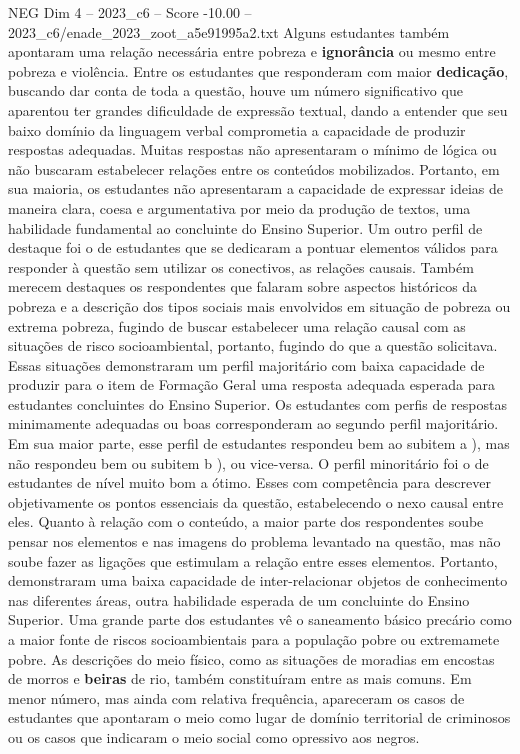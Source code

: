 \begin{textsample}{NEG Dim 4 – 2023\_c6 – Score -10.00 – 2023\_c6/enade\_2023\_zoot\_a5e91995a2.txt}
Alguns estudantes também apontaram uma relação necessária entre pobreza e \textbf{ignorância} ou mesmo entre pobreza e violência.
Entre os estudantes que responderam com maior \textbf{dedicação}, buscando dar conta de toda a questão, houve um número significativo que aparentou ter grandes dificuldade de expressão textual, dando a entender que seu baixo domínio da linguagem verbal comprometia a capacidade de produzir respostas adequadas.
Muitas respostas não apresentaram o mínimo de lógica ou não buscaram estabelecer relações entre os conteúdos mobilizados.
Portanto, em sua maioria, os estudantes não apresentaram a capacidade de expressar ideias de maneira clara, coesa e argumentativa por meio da produção de textos, uma habilidade fundamental ao concluinte do Ensino Superior.
Um outro perfil de destaque foi o de estudantes que se dedicaram a pontuar elementos válidos para responder à questão sem utilizar os conectivos, as relações causais.
Também merecem destaques os respondentes que falaram sobre aspectos históricos da pobreza e a descrição dos tipos sociais mais envolvidos em situação de pobreza ou extrema pobreza, fugindo de buscar estabelecer uma relação causal com as situações de risco socioambiental, portanto, fugindo do que a questão solicitava.
Essas situações demonstraram um perfil majoritário com baixa capacidade de produzir para o item de Formação Geral uma resposta adequada esperada para estudantes concluintes do Ensino Superior.
Os estudantes com perfis de respostas minimamente adequadas ou boas corresponderam ao segundo perfil majoritário.
Em sua maior parte, esse perfil de estudantes respondeu bem ao subitem a ), mas não respondeu bem ou subitem b ), ou vice-versa.
O perfil minoritário foi o de estudantes de nível muito bom a ótimo.
Esses com competência para descrever objetivamente os pontos essenciais da questão, estabelecendo o nexo causal entre eles.
Quanto à relação com o conteúdo, a maior parte dos respondentes soube pensar nos elementos e nas imagens do problema levantado na questão, mas não soube fazer as ligações que estimulam a relação entre esses elementos.
Portanto, demonstraram uma baixa capacidade de inter-relacionar objetos de conhecimento nas diferentes áreas, outra habilidade esperada de um concluinte do Ensino Superior.
Uma grande parte dos estudantes vê o saneamento básico precário como a maior fonte de riscos socioambientais para a população pobre ou extremamete pobre.
As descrições do meio físico, como as situações de moradias em encostas de morros e \textbf{beiras} de rio, também constituíram entre as mais comuns.
Em menor número, mas ainda com relativa frequência, apareceram os casos de estudantes que apontaram o meio como lugar de domínio territorial de criminosos ou os casos que indicaram o meio social como opressivo aos negros.

\end{textsample}
